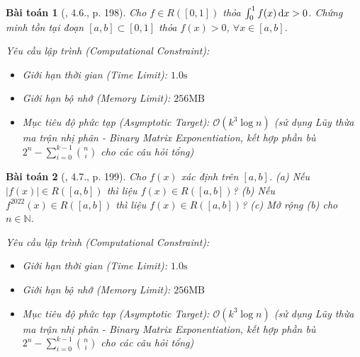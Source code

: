 \documentclass{article}
\newtheorem{baitoan}{Bài toán}
\begin{document}
\begin{baitoan}[\cite{Quoc_Long_Dat_Nam_VMC}, 4.6., p. 198]
	Cho $f\in R([0,1])$ thỏa $\int_0^1 f(x)\,{\rm d}x > 0$. Chứng minh tồn tại đoạn $[a,b]\subset[0,1]$ thỏa $f(x) > 0$, $\forall x\in[a,b]$.

    \vspace{0.5em}
    \emph{Yêu cầu lập trình (Computational Constraint):}
    \begin{itemize}
        \item Giới hạn thời gian (Time Limit): $1.0\mathrm{s}$
        \item Giới hạn bộ nhớ (Memory Limit): $256\mathrm{MB}$
        \item Mục tiêu độ phức tạp (Asymptotic Target): $\mathcal{O}(k^3 \log n)$ (sử dụng Lũy thừa ma trận nhị phân - Binary Matrix Exponentiation, kết hợp phần bù $2^n - \sum_{i=0}^{k-1} \binom{n}{i}$ cho các câu hỏi tổng)
    \end{itemize}
\end{baitoan}


\begin{baitoan}[\cite{Quoc_Long_Dat_Nam_VMC}, 4.7., p. 199]
	Cho $f(x)$ xác định trên $[a,b]$. (a) Nếu $|f(x)|\in R([a,b])$ thì liệu $f(x)\in R([a,b])$? (b) Nếu $f^{2022}(x)\in R([a,b])$ thì liệu $f(x)\in R([a,b])$? (c) Mở rộng (b) cho $n\in\mathbb{N}$.

    \vspace{0.5em}
    \emph{Yêu cầu lập trình (Computational Constraint):}
    \begin{itemize}
        \item Giới hạn thời gian (Time Limit): $1.0\mathrm{s}$
        \item Giới hạn bộ nhớ (Memory Limit): $256\mathrm{MB}$
        \item Mục tiêu độ phức tạp (Asymptotic Target): $\mathcal{O}(k^3 \log n)$ (sử dụng Lũy thừa ma trận nhị phân - Binary Matrix Exponentiation, kết hợp phần bù $2^n - \sum_{i=0}^{k-1} \binom{n}{i}$ cho các câu hỏi tổng)
    \end{itemize}
\end{baitoan}
\end{document}
